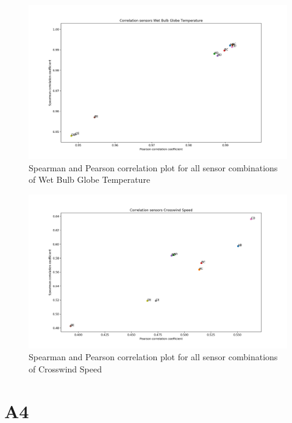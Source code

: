 \documentclass{article}
\begin{document}
    \begin{figure}[H]
        \includegraphics[width=\textwidth]{cor_wbgt}
        \caption{Spearman and Pearson correlation plot for all sensor combinations of Wet Bulb Globe Temperature}
    \end{figure}

    \begin{figure}[H]
        \includegraphics[width=\textwidth]{cor_cwindspeed}
        \caption{Spearman and Pearson correlation plot for all sensor combinations of Crosswind Speed}
    \end{figure}

\section{A4}
\end{document}
